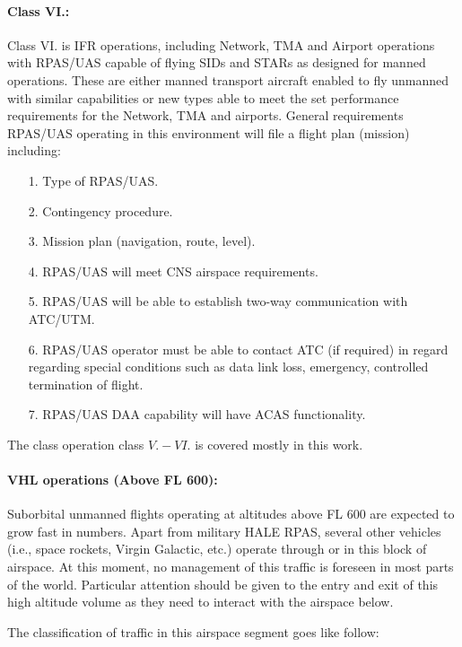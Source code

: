 \paragraph{Class VI.:} Class VI. is IFR operations, including Network, TMA and Airport operations with RPAS/UAS capable of flying SIDs and STARs as designed for manned operations. These are either manned transport aircraft enabled to fly unmanned with similar capabilities or new types able to meet the set performance requirements for the Network, TMA and airports. General requirements RPAS/UAS operating in this environment will file a flight plan (mission) including:
    \begin{itemize}
        \item[1.] Type of RPAS/UAS.
        \item[2.] Contingency procedure.
        \item[3.] Mission plan (navigation, route, level).
        \item[4.] RPAS/UAS will meet CNS airspace requirements.
        \item[5.] RPAS/UAS will be able to establish two-way communication with ATC/UTM.
        \item[6.] RPAS/UAS operator must be able to contact ATC (if required) in regard regarding special conditions such as data link loss, emergency, controlled termination of flight.
        \item[7.] RPAS/UAS DAA capability will have ACAS functionality.
    \end{itemize}

\begin{note}
    The class operation class $V.-VI.$ is covered mostly in this work.
\end{note}

\paragraph{VHL operations (Above FL 600):} Suborbital unmanned flights operating at altitudes above FL 600 are expected to grow fast in numbers. Apart from military HALE RPAS, several other vehicles (i.e., space rockets, Virgin Galactic, etc.) operate through or in this block of airspace. At this moment, no management of this traffic is foreseen in most parts of the world. Particular attention should be given to the entry and exit of this high altitude volume as they need to interact with the airspace below.

\noindent The classification of traffic in this airspace segment goes like follow:


